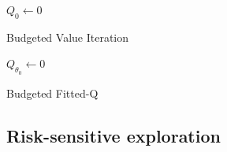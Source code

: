 \begin{minipage}[t]{0.47\textwidth}
	\vspace{0pt}  
	
	\begin{algorithm}[H]
		\DontPrintSemicolon
		$Q_{0} \leftarrow 0$\;
		\caption{Budgeted Value Iteration}
		\label{algo:bvi}
		
	\end{algorithm}
	
\end{minipage}%
\hfill
\begin{minipage}[t]{0.47\textwidth}
	\vspace{0pt}
	
	\begin{algorithm}[H]
		\DontPrintSemicolon
		\KwData{$\cD$}
		$Q_{\theta_0} \leftarrow 0$\;
		\caption{Budgeted Fitted-Q}
		\label{algo:bftq}
		
	\end{algorithm}
	
\end{minipage}

\subsection{Risk-sensitive exploration}
\label{sec:exploration}

